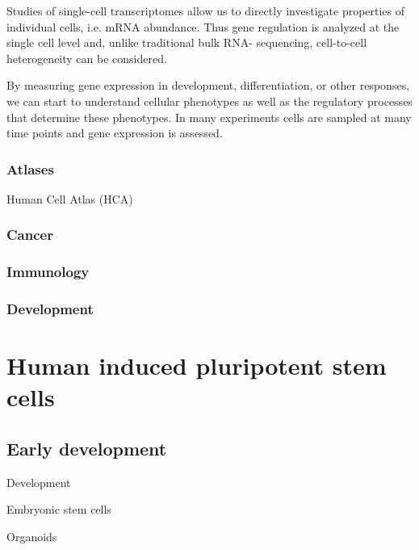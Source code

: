 Studies of single-cell transcriptomes allow us to directly investigate properties of individual cells, i.e. mRNA abundance. 
Thus gene regulation is analyzed at the single cell level and, unlike traditional bulk RNA- sequencing, cell-to-cell heterogeneity can be considered.

By measuring gene expression in development, differentiation, or other responses, we can start to understand cellular phenotypes as well as the regulatory processes that determine these phenotypes. 
In many experiments cells are sampled at many time points and gene expression is assessed.

\subsubsection{Atlases}

Human Cell Atlas (HCA)
\subsubsection{Cancer}
\subsubsection{Immunology}
\subsubsection{Development}

\newpage

\section{Human induced pluripotent stem cells}  %

\subsection{Early development}

Development

Embryonic stem cells

Organoids



